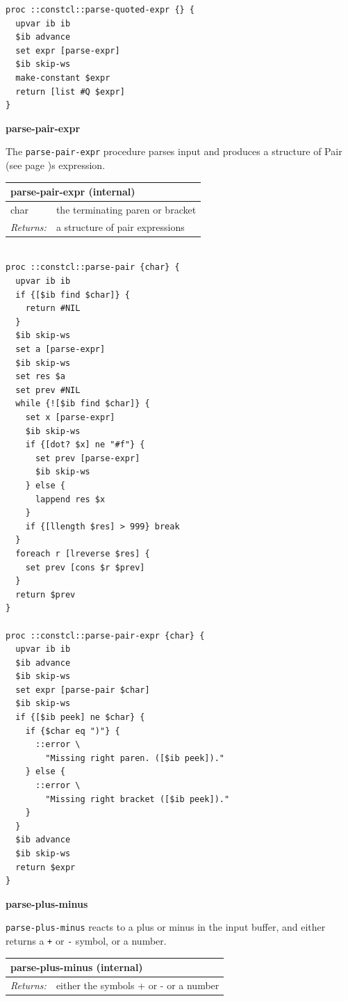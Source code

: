 \documentclass[twoside,9pt]{report}
\begin{document}
\noindent\makebox[\linewidth]{\rule{\linewidth}{0.4pt}}
\begin{lstlisting}
proc ::constcl::parse-quoted-expr {} {
  upvar ib ib
  $ib advance
  set expr [parse-expr]
  $ib skip-ws
  make-constant $expr
  return [list #Q $expr]
}
\end{lstlisting}
\noindent\makebox[\linewidth]{\rule{\linewidth}{0.4pt}}

\textbf{parse-pair-expr}


The \texttt{parse-pair-expr} procedure parses input and produces a structure of Pair (see page \pageref{pairs-and-lists})s expression.

\begin{tabular}{ |l l| }
\hline
\multicolumn{2}{|l|}{parse-pair-expr (internal)} \\
\hline
char & the terminating paren or bracket \\
\textit{Returns:} & a structure of pair expressions \\
\hline
\end{tabular}

\noindent\makebox[\linewidth]{\rule{\linewidth}{0.4pt}}
\begin{lstlisting}
 
proc ::constcl::parse-pair {char} {
  upvar ib ib
  if {[$ib find $char]} {
    return #NIL
  }
  $ib skip-ws
  set a [parse-expr]
  $ib skip-ws
  set res $a
  set prev #NIL
  while {![$ib find $char]} {
    set x [parse-expr]
    $ib skip-ws
    if {[dot? $x] ne "#f"} {
      set prev [parse-expr]
      $ib skip-ws
    } else {
      lappend res $x
    }
    if {[llength $res] > 999} break
  }
  foreach r [lreverse $res] {
    set prev [cons $r $prev]
  }
  return $prev
}
 
proc ::constcl::parse-pair-expr {char} {
  upvar ib ib
  $ib advance
  $ib skip-ws
  set expr [parse-pair $char]
  $ib skip-ws
  if {[$ib peek] ne $char} {
    if {$char eq ")"} {
      ::error \
        "Missing right paren. ([$ib peek])."
    } else {
      ::error \
        "Missing right bracket ([$ib peek])."
    }
  }
  $ib advance
  $ib skip-ws
  return $expr
}
\end{lstlisting}
\noindent\makebox[\linewidth]{\rule{\linewidth}{0.4pt}}

\textbf{parse-plus-minus}


\texttt{parse-plus-minus} reacts to a plus or minus in the input buffer, and either returns a \texttt{+} or \texttt{-} symbol, or a number.

\begin{tabular}{ |l l| }
\hline
\multicolumn{2}{|l|}{parse-plus-minus (internal)} \\
\hline
\textit{Returns:} & either the symbols + or - or a number \\
\hline
\end{tabular}
\end{document}
